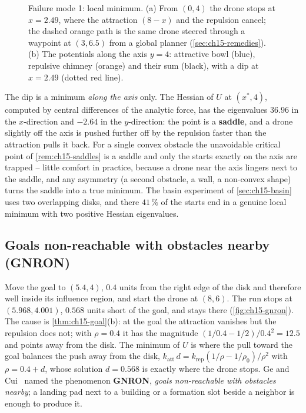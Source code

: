 \begin{figure}[tb]
  \centering
  \caption{Failure mode 1: local minimum. (a) From $(0, 4)$ the drone stops
  at $x = 2.49$, where the attraction $(8 - x)$ and the repulsion cancel; the
  dashed orange path is the same drone steered through a waypoint at
  $(3, 6.5)$ from a global planner (\cref{sec:ch15-remedies}). (b) The
  potentials along the axis $y = 4$: attractive bowl (blue), repulsive
  chimney (orange) and their sum (black), with a dip at $x = 2.49$ (dotted
  red line).}
  \label{fig:ch15-localmin}
\end{figure}

The dip is a minimum \emph{along the axis} only. The Hessian of $U$ at
$(x^*, 4)$, computed by central differences of the analytic force, has the
eigenvalues $36.96$ in the $x$-direction and $-2.64$ in the $y$-direction:
the point is a \textbf{saddle}, and a drone slightly off
the axis is pushed further off by the repulsion faster than the attraction
pulls it back. For a single convex obstacle the unavoidable critical point
of \cref{rem:ch15-saddles} is a saddle and only the starts exactly on the
axis are trapped -- little comfort in practice, because a drone near the
axis lingers next to the saddle, and any asymmetry (a second obstacle, a
wall, a non-convex shape) turns the saddle into a true minimum. The basin
experiment of \cref{sec:ch15-basin} uses two overlapping disks, and there
$41\,\%$ of the starts end in a genuine local minimum with two positive
Hessian eigenvalues.

\subsection{Goals non-reachable with obstacles nearby (GNRON)}
\label{sec:ch15-gnron}

Move the goal to $(5.4, 4)$, $0.4$ units from the right edge of the disk and
therefore well inside its influence region, and start the drone at $(8, 6)$.
The run  stops at $(5.968, 4.001)$, $0.568$ units short
of the goal, and stays there (\cref{fig:ch15-gnron}). The cause is
\cref{thm:ch15-goal}(b): at the goal the attraction vanishes but the
repulsion does not; with $\rho = 0.4$ it has the magnitude $(1/0.4 -
1/2)/0.4^2 = 12.5$ and points away from the disk. The minimum of $U$ is
where the pull toward the goal balances the push away from the disk,
$k_{\mathrm{att}}\, d = k_{\mathrm{rep}} (1/\rho - 1/\rho_0)/\rho^2$ with
$\rho = 0.4 + d$, whose solution $d = 0.568$ is exactly where the drone
stops. Ge and Cui~\cite{ge2000new} named the phenomenon
\textbf{GNRON},
\emph{goals non-reachable with obstacles nearby}; a landing pad next to a
building or a formation slot beside a neighbor is enough to produce it.

